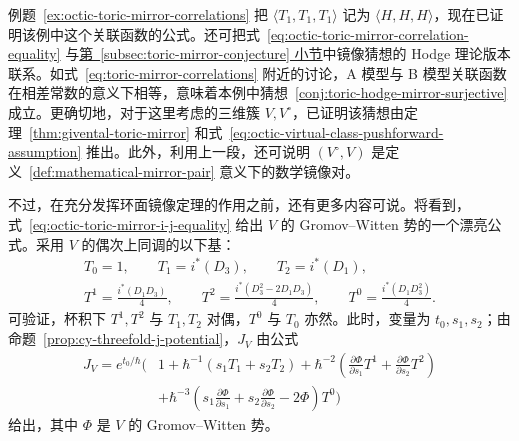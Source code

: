 \begin{example}
例题~\ref{ex:octic-toric-mirror-correlations} 把 $\langle T_1,T_1,T_1\rangle$ 记为 $\langle H,H,H\rangle$，现在已证明该例中这个关联函数的公式。还可把式~\eqref{eq:octic-toric-mirror-correlation-equality} 与\hyperref[subsec:toric-mirror-conjecture]{第~\ref*{subsec:toric-mirror-conjecture} 小节}中镜像猜想的 Hodge 理论版本联系。如式~\eqref{eq:toric-mirror-correlations} 附近的讨论，A 模型与 B 模型关联函数在相差常数的意义下相等，意味着本例中猜想~\ref{conj:toric-hodge-mirror-surjective} 成立。更确切地，对于这里考虑的三维簇 $V,V^\circ$，已证明该猜想由定理~\ref{thm:givental-toric-mirror} 和式~\eqref{eq:octic-virtual-class-pushforward-assumption} 推出。此外，利用上一段，还可说明 $(V^\circ,V)$ 是定义~\ref{def:mathematical-mirror-pair} 意义下的数学镜像对。

不过，在充分发挥环面镜像定理的作用之前，还有更多内容可说。将看到，式~\eqref{eq:octic-toric-mirror-i-j-equality} 给出 $V$ 的 Gromov--Witten 势的一个漂亮公式。采用 $V$ 的偶次上同调的以下基：
\[
\begin{gathered}
T_0=1,\qquad T_1=i^*(D_3),\qquad T_2=i^*(D_1),\\
T^1=\frac{i^*(D_1D_3)}4,\qquad T^2=\frac{i^*(D_3^2-2D_1D_3)}4,\qquad T^0=\frac{i^*(D_1D_3^2)}4.
\end{gathered}
\]
可验证，杯积下 $T^1,T^2$ 与 $T_1,T_2$ 对偶，$T^0$ 与 $T_0$ 亦然。此时，变量为 $t_0,s_1,s_2$；由命题~\ref{prop:cy-threefold-j-potential}，$J_V$ 由公式
\begin{equation}\label{eq:octic-ordinary-j-potential}
\begin{aligned}
J_V=e^{t_0/\hbar}\Biggl(&1+\hbar^{-1}(s_1T_1+s_2T_2)
+\hbar^{-2}\left(\frac{\partial\Phi}{\partial s_1}T^1+\frac{\partial\Phi}{\partial s_2}T^2\right)\\
&+\hbar^{-3}\left(s_1\frac{\partial\Phi}{\partial s_1}+s_2\frac{\partial\Phi}{\partial s_2}-2\Phi\right)T^0\Biggr)
\end{aligned}
\end{equation}
给出，其中 $\Phi$ 是 $V$ 的 Gromov--Witten 势。


\end{example}
